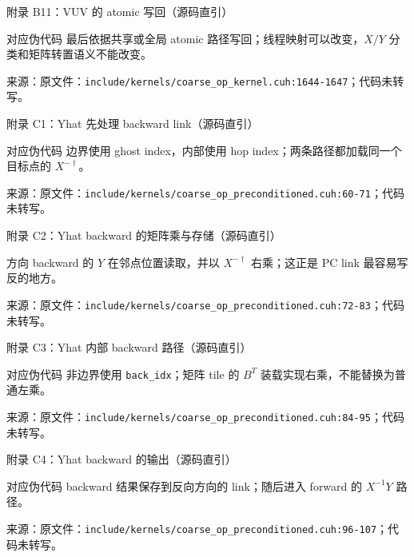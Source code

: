 \documentclass[UTF8,aspectratio=169,11pt]{ctexbeamer}
\newcommand{\source}[1]{\vspace{0.05em}\par{\raggedright\scriptsize\color{muted}来源：#1\par}}
\newcommand{\codepath}[1]{\nolinkurl{#1}}
\begin{document}
\begin{frame}[fragile,t]{附录 B11：VUV 的 atomic 写回（源码直引）}
  
  \begin{block}{对应伪代码}
    最后依据共享或全局 atomic 路径写回；线程映射可以改变，\(X/Y\) 分类和矩阵转置语义不能改变。
  \end{block}
  \source{原文件：\codepath{include/kernels/coarse_op_kernel.cuh:1644-1647}；代码未转写。}
\end{frame}

\begin{frame}[fragile,t]{附录 C1：Yhat 先处理 backward link（源码直引）}
  
  \begin{block}{对应伪代码}
    边界使用 ghost index，内部使用 hop index；两条路径都加载同一个目标点的 \(X^{-\dagger}\)。
  \end{block}
  \source{原文件：\codepath{include/kernels/coarse_op_preconditioned.cuh:60-71}；代码未转写。}
\end{frame}

\begin{frame}[fragile,t]{附录 C2：Yhat backward 的矩阵乘与存储（源码直引）}
  
  \begin{alertblock}{方向}
    backward 的 \(Y\) 在邻点位置读取，并以 \(X^{-\dagger}\) 右乘；这正是 PC link 最容易写反的地方。
  \end{alertblock}
  \source{原文件：\codepath{include/kernels/coarse_op_preconditioned.cuh:72-83}；代码未转写。}
\end{frame}

\begin{frame}[fragile,t]{附录 C3：Yhat 内部 backward 路径（源码直引）}
  
  \begin{block}{对应伪代码}
    非边界使用 \texttt{back\_idx}；矩阵 tile 的 \(B^T\) 装载实现右乘，不能替换为普通左乘。
  \end{block}
  \source{原文件：\codepath{include/kernels/coarse_op_preconditioned.cuh:84-95}；代码未转写。}
\end{frame}

\begin{frame}[fragile,t]{附录 C4：Yhat backward 的输出（源码直引）}
  
  \begin{block}{对应伪代码}
    backward 结果保存到反向方向的 link；随后进入 forward 的 \(X^{-1}Y\) 路径。
  \end{block}
  \source{原文件：\codepath{include/kernels/coarse_op_preconditioned.cuh:96-107}；代码未转写。}
\end{frame}
\end{document}
